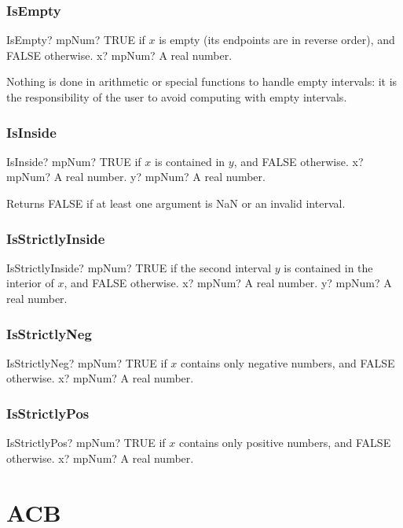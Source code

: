 \subsection{IsEmpty}

\begin{mpFunctionsExtract}
	\mpFunctionOne
	{IsEmpty? mpNum? TRUE  if $x$ is empty (its endpoints are in reverse order), and FALSE otherwise.}
	{x? mpNum? A real number.}
\end{mpFunctionsExtract}

\vspace{0.3cm}
Nothing is done in arithmetic or special functions to handle empty intervals: it is the responsibility of the user to avoid computing with empty intervals.




\subsection{IsInside}

\begin{mpFunctionsExtract}
	\mpFunctionTwo
	{IsInside? mpNum? TRUE  if $x$ is contained in $y$, and FALSE otherwise.}
	{x? mpNum? A real number.}
	{y? mpNum? A real number.}
\end{mpFunctionsExtract}

\vspace{0.3cm}
Returns FALSE if at least one argument is NaN or an invalid interval.




\subsection{IsStrictlyInside}

\begin{mpFunctionsExtract}
	\mpFunctionTwo
	{IsStrictlyInside? mpNum? TRUE  if the second interval $y$ is contained in the interior of $x$, and FALSE otherwise.}
	{x? mpNum? A real number.}
	{y? mpNum? A real number.}
\end{mpFunctionsExtract}




\subsection{IsStrictlyNeg}

\begin{mpFunctionsExtract}
	\mpFunctionOne
	{IsStrictlyNeg? mpNum? TRUE if $x$ contains only negative numbers, and FALSE otherwise.}
	{x? mpNum? A real number.}
\end{mpFunctionsExtract}




\subsection{IsStrictlyPos}

\begin{mpFunctionsExtract}
	\mpFunctionOne
	{IsStrictlyPos? mpNum? TRUE if $x$ contains only positive numbers, and FALSE otherwise.}
	{x? mpNum? A real number.}
\end{mpFunctionsExtract}








\chapter{ACB}
\lipsum[1]
